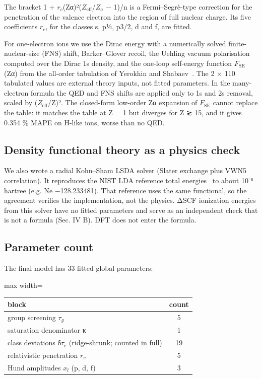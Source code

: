 \documentclass[aps,pra,preprint,notitlepage,superscriptaddress,amsmath,amssymb]{revtex4-2}
\begin{document}
The bracket 1 + $r_{c}$(Zα)²($Z_{\mathrm{eff}}$/$Z_{a}$ − 1)/n is a Fermi–Segrè-type correction for the penetration of the valence electron into the region of full nuclear charge. Its five coefficients $r_{c}$, for the classes s, p½, p3/2, d and f, are fitted.


For one-electron ions we use the Dirac energy with a numerically solved finite-nuclear-size (FNS) shift, Barker–Glover recoil, the Uehling vacuum polarisation computed over the Dirac 1s density, and the one-loop self-energy function $F_{\mathrm{SE}}$(Zα) from the all-order tabulation of Yerokhin and Shabaev~\cite{r30}. The 2 × 110 tabulated values are external theory inputs, not fitted parameters. In the many-electron formula the QED and FNS shifts are applied only to 1s and 2s removal, scaled by ($Z_{\mathrm{eff}}$/Z)². The closed-form low-order Zα expansion of $F_{\mathrm{SE}}$ cannot replace the table: it matches the table at Z = 1 but diverges for Z ≳ 15, and it gives 0.354 \% MAPE on H-like ions, worse than no QED.


\subsection{Density functional theory as a physics check}

We also wrote a radial Kohn–Sham LSDA solver (Slater exchange plus VWN5 correlation). It reproduces the NIST LDA reference total energies~\cite{r27} to about 10⁻⁶ hartree (e.g. Ne −128.233481). That reference uses the same functional, so the agreement verifies the implementation, not the physics. ΔSCF ionization energies from this solver have no fitted parameters and serve as an independent check that is not a formula (Sec. IV B). DFT does not enter the formula.


\subsection{Parameter count}

The final model has 33 fitted global parameters:


\begin{table}[h]
\footnotesize\linespread{1}\selectfont\setlength{\tabcolsep}{5pt}\renewcommand{\arraystretch}{1.1}
\begin{adjustbox}{max width=\linewidth}
\begin{tabular}{lc}
\hline\hline
block & count \\
\hline
group screening $τ_{g}$ & 5 \\
saturation denominator κ & 1 \\
class deviations δ$τ_{c}$ (ridge-shrunk; counted in full) & 19 \\
relativistic penetration $r_{c}$ & 5 \\
Hund amplitudes $x_{l}$ (p, d, f) & 3 \\
\hline\hline
\end{tabular}
\end{adjustbox}
\end{table}
\end{document}

